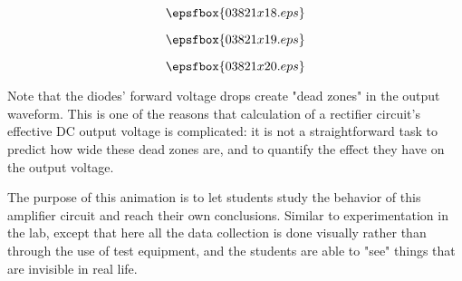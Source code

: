 \vfil \eject
$$\epsfbox{03821x18.eps}$$

\vfil \eject
$$\epsfbox{03821x19.eps}$$

\vfil \eject
$$\epsfbox{03821x20.eps}$$


\vfil \eject







Note that the diodes' forward voltage drops create "dead zones" in the output waveform.  This is one of the reasons that calculation of a rectifier circuit's effective DC output voltage is complicated: it is not a straightforward task to predict how wide these dead zones are, and to quantify the effect they have on the output voltage.







The purpose of this animation is to let students study the behavior of this amplifier circuit and reach their own conclusions.  Similar to experimentation in the lab, except that here all the data collection is done visually rather than through the use of test equipment, and the students are able to "see" things that are invisible in real life.




